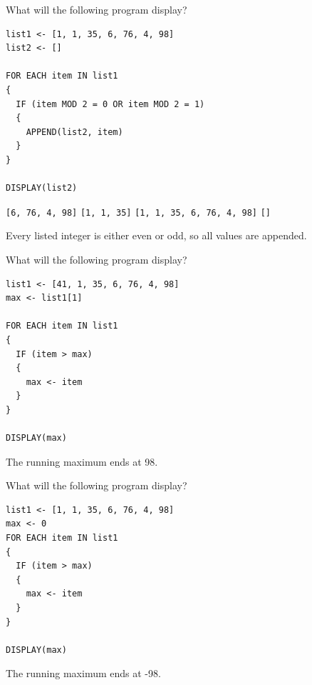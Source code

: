 \newpage 

\question[5]
What will the following program display?
\begin{lstlisting}[style=pseudo]
list1 <- [1, 1, 35, 6, 76, 4, 98]
list2 <- []

FOR EACH item IN list1
{
  IF (item MOD 2 = 0 OR item MOD 2 = 1)
  {
    APPEND(list2, item)
  }
}

DISPLAY(list2)
\end{lstlisting}
\begin{choices}
  \choice \texttt{[6, 76, 4, 98]}
  \choice \texttt{[1, 1, 35]}
  \CorrectChoice \texttt{[1, 1, 35, 6, 76, 4, 98]}
  \choice \texttt{[]}
\end{choices}
\begin{solution}
  Every listed integer is either even or odd, so all values are appended.
\end{solution}

\question[5]
What will the following program display?
\begin{lstlisting}[style=pseudo]
list1 <- [41, 1, 35, 6, 76, 4, 98]
max <- list1[1]

FOR EACH item IN list1
{
  IF (item > max)
  {
    max <- item
  }
}

DISPLAY(max)
\end{lstlisting}
\begin{choices}
\end{choices}
\begin{solution}
  The running maximum ends at 98.
\end{solution}

\newpage 

\question[5]
What will the following program display?
\begin{lstlisting}[style=pseudo]
list1 <- [1, 1, 35, 6, 76, 4, 98]
max <- 0
FOR EACH item IN list1
{
  IF (item > max)
  {
    max <- item
  }
}

DISPLAY(max)
\end{lstlisting}
\begin{choices}
\end{choices}
\begin{solution}
  The running maximum ends at -98.
\end{solution}

\newpage

